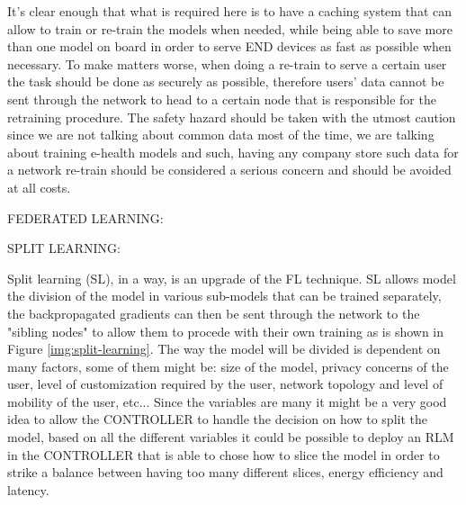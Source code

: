 It's clear enough that what is required here is to have a caching system that can allow to train or
re-train the models when needed, while being able to save more than one model on board in order to
serve END devices as fast as possible when necessary. To make matters worse, when doing a re-train
to serve a certain user the task should be done as securely as possible, therefore users' data
cannot be sent through the network to head to a certain node that is responsible for the retraining
procedure.
The safety hazard should be taken with the utmost caution since we are not talking about common data
most of the time, we are talking about training e-health models and such, having any company store
such data for a network re-train should be considered a serious concern and should be avoided at all costs.

\bigskip
\noindent
FEDERATED LEARNING:


\bigskip
\noindent
SPLIT LEARNING:

Split learning (SL), in a way, is an upgrade of the FL technique.
SL allows model the division of the model in various sub-models that can be trained separately, the
backpropagated gradients can then be sent through the network to the "sibling nodes" to allow them
to procede with their own training as is shown in Figure \ref{img:split-learning}.
The way the model will be divided is dependent on many factors, some of them might be: size of the
model, privacy concerns of the user, level of customization required by the user, network topology
and level of mobility of the user, etc...
Since the variables are many it might be a very good idea to allow the CONTROLLER to handle the
decision on how to split the model, based on all the different variables it could be possible to
deploy an RLM in the CONTROLLER that is able to chose how to slice the model in order to strike a
balance between having too many different slices, energy efficiency and latency.

